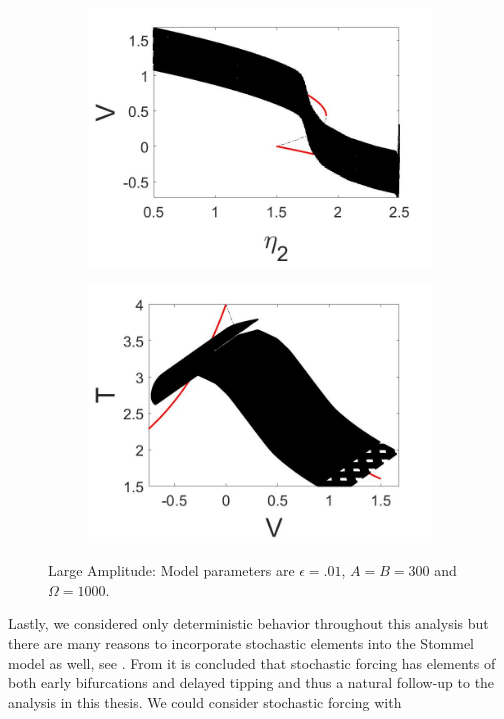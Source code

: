 \begin{figure}[H]
\centering
\begin{subfigure}{.5\textwidth}
 \centering
 \includegraphics[width=\linewidth]{conclusion/large_amp_V.jpg}
 \caption{}
\end{subfigure}%
\begin{subfigure}{.5\textwidth}
 \centering
 \includegraphics[width=\linewidth]{conclusion/large_amp_T.jpg}
 \caption{}
\end{subfigure}
\caption{Large Amplitude: Model parameters are $\epsilon=.01$, $A=B=300$ and $\Omega=1000$.}
\label{fig:large_amp}
\end{figure}

\indent Lastly, we considered only deterministic behavior throughout this analysis but there are many reasons to incorporate stochastic elements into the Stommel model as well, see \cite{lorenzo2012role}. From \cite{zhu2015tipping} it is concluded that stochastic forcing has elements of both early bifurcations and delayed tipping and thus a natural follow-up to the analysis in this thesis. We could consider stochastic forcing with

